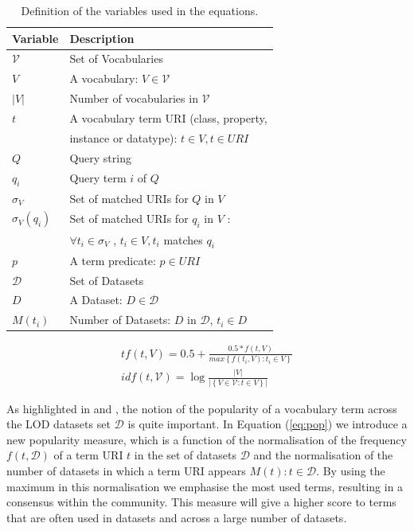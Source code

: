 \documentclass{iosart2c}
\begin{document}
\begin{table}[h!tb]
\caption{Definition of the variables used in the equations.}
\label{tab:variable}
\begin{tabular}{|l|l|}
  \hline
  \textbf{Variable} & \textbf{Description} \\ \hline
  $\mathcal{V}$ & Set of Vocabularies \\ \hline
  $V$ & A vocabulary: $V \in \mathcal{V}$ \\ \hline
  $|V|$ & Number of vocabularies in $\mathcal{V}$ \\ \hline
  $t$ & A vocabulary term URI (class, property, \\
       &  instance or datatype): $t \in V, t \in URI$ \\ \hline
  $Q$ & Query string \\ \hline
  $q_i$ & Query term $i$ of $Q$ \\ \hline
  $\sigma_V$ & Set of matched URIs for $Q$ in $V$ \\ \hline
  $\sigma_V(q_i)$ & Set of matched URIs for $q_i$ in $V$ : \\
         & $\forall t_i \in \sigma_V$ , $t_i \in V ,  t_i$ matches $q_i$ \\ \hline
  $p$ & A term predicate: $p \in URI$ \\ \hline
  $\mathcal{D}$ & Set of Datasets \\ \hline
  $D$ & A Dataset: $D \in \mathcal{D}$ \\ \hline
  $M(t_i)$ & Number of Datasets: $D$ in $\mathcal{D}$, $t_i \in D$ \\ \hline
\end{tabular}
\end{table}

\begin{equation}\label{eq:tfidf}
\begin{split}
tf(t,V) =0.5+ \frac{0.5 * f(t,V)}{max\left\{f(t_i,V): t_i \in V\right\}} \\
idf(t,\mathcal{V}) =\log\frac{|V|}{|\left\{V \in \mathcal{V}: t \in V\right\}|}
\end{split}
\end{equation}
 

As highlighted in \cite{butt2014} and \cite{schaible2013lover}, the notion of the popularity of a vocabulary term across the LOD datasets set $\mathcal{D}$ is quite important. In Equation (\ref{eq:pop}) we introduce a new popularity measure, which is a function of the normalisation of the frequency $f(t,\mathcal{D})$ of a term URI $t$ in the set of datasets $\mathcal{D}$ and the normalisation of the number of datasets in which a term URI appears $M(t): t \in \mathcal{D}$. By using the maximum in this normalisation we emphasise the most used terms, resulting in a consensus within the community. This measure will give a higher score to terms that are often used in datasets and across a large number of datasets.
\end{document}

